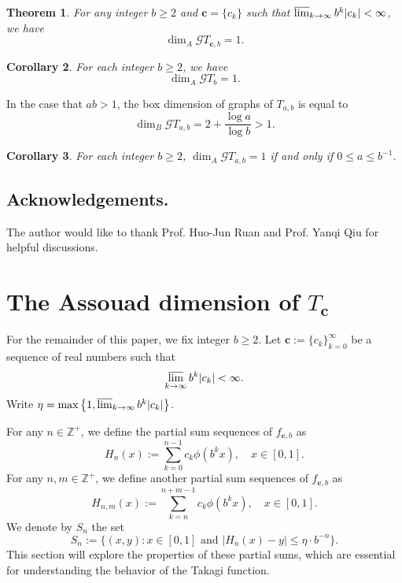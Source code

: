 \documentclass{amsart}
\newtheorem{thm}{Theorem}[section]
\newtheorem{cor}[thm]{Corollary}
\theoremstyle{definition}
\theoremstyle{remark}
\numberwithin{equation}{section}
\newcommand{\Z}{{\mathbb Z}}
\def\g{\mathcal{G}}
\def\bfc{\mathbf{c}}
\begin{document}
\begin{thm}\label{thm:assouad}
For any integer $b\geq2$ and $\bfc=\{c_k\} $ such that 
$\varlimsup_{k \to \infty}  b^k|c_k |  <\infty$, we have
$$\dim_A\g T_{\bfc,b}=1.$$
\end{thm}

\begin{cor}\label{cor:assouad-old}
For each integer $b \geq2$, we have
$$\dim_A\g T_b=1.$$
\end{cor}

In the case that $ab>1$,
the box dimension of graphs of $T_{a,b}$ \cite{B15,KMY84} is equal to
$$
	\dim_B \g T_{a,b}=2+\frac{\log a}{\log b}>1.
$$

\begin{cor}\label{cor:assouad}
For each integer $b\geq2$, 
$\dim_A\g T_{a,b}=1$
if and only if $0 \leq a \leq b^{-1} $.
\end{cor}


\subsection*{Acknowledgements.} 
\medskip
The author would like to thank Prof. Huo-Jun Ruan and Prof. Yanqi Qiu for helpful discussions.






\section{The Assouad dimension of $T_{\bfc}$}
For the remainder of this paper, we fix integer $b \geq 2$.
Let $\bfc:=\{c_k\}_{k=0}^\infty$ be a sequence of real numbers such that
\begin{equation*}
	\varlimsup_{k \to \infty}  b^k|c_k |  <\infty.
\end{equation*}
Write $\eta=\max\big\{1,\varlimsup_{k \to \infty} b^k|c_k|\big\}$.

For any $n \in \Z^+$,
we define the partial sum sequences of $f_{\bfc,b}$ as
$$
	H_{n}(x):=\sum_{k=0}^{n-1} c_k \phi(b^k x), \quad x\in [0,1].
$$
For any $n,m \in \Z^+$,
we define another partial sum sequences of $f_{\bfc,b}$ as
$$
	H_{n,m}(x):=\sum_{k=n}^{n+m-1} c_k \phi(b^k x), \quad x\in [0,1].
$$
We denote by $S_{n}$ the set
$$
	S_{n}:=\big\{  (x,y):   x \in  [0,1] \mbox{ and } |H_{n}(x) -y | \leq \eta \cdot b^{-n}  \big\}.
$$
This section will explore the properties of these partial sums, which are essential for understanding the behavior of the Takagi function.
\end{document}
